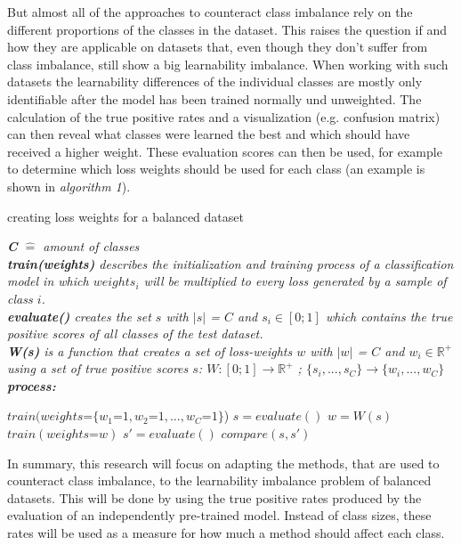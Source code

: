 \documentclass[journal]{IEEEtran}
\begin{document}
But almost all of the approaches to counteract class imbalance rely on the different proportions of the classes in the dataset. 
This raises the question if and how they are applicable on datasets that, even though they don't suffer from class imbalance, still show a big learnability imbalance.
When working with such datasets the learnability differences of the individual classes are mostly only identifiable after the model has been trained normally und unweighted. %
The calculation of the true positive rates and a visualization (e.g. confusion matrix) can then reveal what classes were learned the best and which should have received a higher weight.
These evaluation scores can then be used, for example to determine which loss weights should be used for each class (an example is shown in \emph{algorithm 1}).

\begin{algorithm}[H]
        \caption{creating loss weights for a balanced dataset}

        \textit{\textbf{C} $\hat{=}$ amount of classes}
        \\ \textit{\textbf{train(weights)} describes the initialization and training process of a classification model in which $weights_i$ will be multiplied to every loss generated by a sample of class $i$.}
        \\ \textit{\textbf{evaluate()} creates the set $s$ with $\left|s\right|$ = $C$ and $s_i \in [0;1]$ which contains the true positive scores of all classes of the test dataset.}
        \\ \textit{\textbf{W(s)} is a function that creates a set of loss-weights $w$ with $\left|w\right|$ = $C$ and $w_i \in \mathbb{R}^{+}$ using a set of true positive scores $s$: $W: [0;1] \rightarrow \mathbb{R}^{+}$ ; $\{s_i,...,s_C\} \rightarrow \{w_i,...,w_C\}$ }
        \\ \textit{\textbf{process:}}
        \begin{algorithmic}[1]
         \STATE $train(weights\texttt{=}\{w_1\texttt{=}1, w_2\texttt{=}1, ..., w_C\texttt{=}1\}$)
         \STATE $s = evaluate()$
         \STATE $w = W(s)$
         \STATE $train(weights\texttt{=}w)$
         \STATE $s' = evaluate()$
         \STATE $compare(s, s')$

        \end{algorithmic}
\end{algorithm}

In summary, this research will focus on adapting the methods, that are used to counteract class imbalance, to the learnability imbalance problem of balanced datasets.
This will be done by using the true positive rates produced by the evaluation of an independently pre-trained model.
Instead of class sizes, these rates will be used as a measure for how much a method should affect each class.
\end{document}
